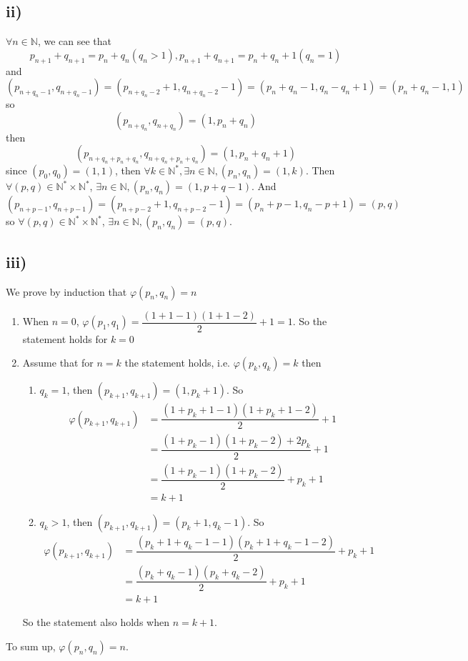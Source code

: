 \documentclass[a4paper,12pt,titlepage]{article}
\begin{document}
\subsection*{ii)}
$\forall n\in\mathbb{N}$, we can see that
$$p_{n+1}+q_{n+1}=p_n+q_n(q_n>1),p_{n+1}+q_{n+1}=p_n+q_n+1(q_n=1)$$
and
$$(p_{n+q_n-1},q_{n+q_n-1})=(p_{n+q_n-2}+1,q_{n+q_n-2}-1)=(p_n+q_n-1,q_n-q_n+1)=(p_n+q_n-1,1)$$
so
$$(p_{n+q_n},q_{n+q_n})=(1,p_n+q_n)$$
then
$$(p_{n+q_n+p_n+q_n},q_{n+q_n+p_n+q_n})=(1,p_n+q_n+1)$$
since $(p_0,q_0)=(1,1)$, then $\forall k\in \mathbb{N}^*,\exists n\in\mathbb{N}, (p_n,q_n)=(1,k)$. Then $\forall (p,q)\in\mathbb{N}^*\times \mathbb{N}^*$, $\exists n\in\mathbb{N},(p_n,q_n)=(1,p+q-1)$. And
$$(p_{n+p-1},q_{n+p-1})=(p_{n+p-2}+1,q_{n+p-2}-1)=(p_n+p-1,q_n-p+1)=(p,q)$$
so $\forall (p,q)\in\mathbb{N}^*\times \mathbb{N}^*$, $\exists n\in\mathbb{N},(p_n,q_n)=(p,q)$.

\subsection*{iii)}
We prove by induction that  $\varphi(p_n,q_n)=n$
\begin{enumerate}
\item When $n=0$, $\varphi(p_1,q_1)=\dfrac{(1+1-1)(1+1-2)}{2}+1=1$. So the statement holds for $k=0$
\item Assume that for $n=k$ the statement holds, i.e. $\varphi(p_k,q_k)=k$
then 
\begin{enumerate}
\item $q_k=1$, then $(p_{k+1},q_{k+1})=(1,p_k+1)$. So
\begin{align*}
\varphi(p_{k+1},q_{k+1})&=\dfrac{(1+p_k+1-1)(1+p_k+1-2)}{2}+1\\
&=\dfrac{(1+p_k-1)(1+p_k-2)+2p_k}{2}+1\\
&=\dfrac{(1+p_k-1)(1+p_k-2)}{2}+p_k+1\\
&=k+1
\end{align*}
\item $q_k>1$, then $(p_{k+1},q_{k+1})=(p_k+1,q_k-1)$. So
\begin{align*}
\varphi(p_{k+1},q_{k+1})&=\dfrac{(p_k+1+q_k-1-1)(p_k+1+q_k-1-2)}{2}+p_k+1\\
&=\dfrac{(p_k+q_k-1)(p_k+q_k-2)}{2}+p_k+1\\
&=k+1
\end{align*}
\end{enumerate}
So the statement also holds when $n=k+1$.
\end{enumerate}

To sum up, $\varphi(p_n,q_n)=n$.
\end{document}
